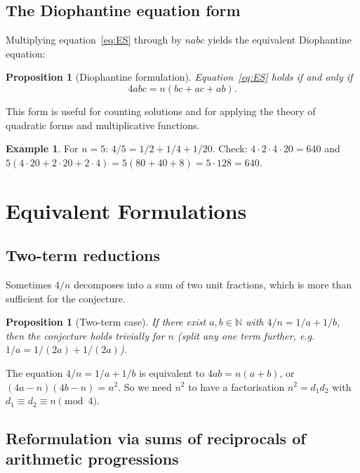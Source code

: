 \documentclass[12pt,a4paper]{amsart}
\newtheorem{proposition}[theorem]{Proposition}
\theoremstyle{definition}
\newtheorem{example}[theorem]{Example}
\newcommand{\N}{\mathbb{N}}
\begin{document}
\subsection{The Diophantine equation form}

Multiplying equation~\eqref{eq:ES} through by $nabc$ yields the equivalent
Diophantine equation:

\begin{proposition}[Diophantine formulation]\label{prop:dioph}
Equation~\eqref{eq:ES} holds if and only if
\begin{equation}\label{eq:dioph}
  4abc = n(bc + ac + ab).
\end{equation}
\end{proposition}

This form is useful for counting solutions and for applying the theory of
quadratic forms and multiplicative functions.

\begin{example}
For $n = 5$: $4/5 = 1/2 + 1/4 + 1/20$.  Check:
$4 \cdot 2 \cdot 4 \cdot 20 = 640$ and $5(4 \cdot 20 + 2 \cdot 20 + 2 \cdot 4)
= 5(80 + 40 + 8) = 5 \cdot 128 = 640$. \checkmark
\end{example}

\section{Equivalent Formulations}

\subsection{Two-term reductions}

Sometimes $4/n$ decomposes into a sum of two unit fractions, which is
more than sufficient for the conjecture.

\begin{proposition}[Two-term case]\label{prop:two-term}
If there exist $a, b \in \N$ with $4/n = 1/a + 1/b$, then the conjecture
holds trivially for $n$ (split any one term further, e.g.\ $1/a = 1/(2a) + 1/(2a)$).
\end{proposition}

The equation $4/n = 1/a + 1/b$ is equivalent to
$4ab = n(a+b)$, or $(4a - n)(4b - n) = n^2$.
So we need $n^2$ to have a factorisation $n^2 = d_1 d_2$ with
$d_1 \equiv d_2 \equiv n \pmod{4}$.

\subsection{Reformulation via sums of reciprocals of arithmetic progressions}
\end{document}
